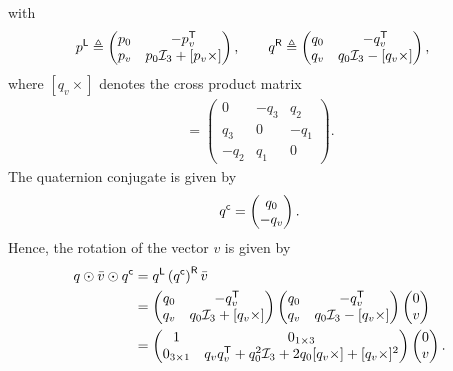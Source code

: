 with 
\begin{align}
p^{\mathsf{L}} &\triangleq \begin{pmatrix} p_0 & -p_v^{\mathsf{T}} \\ p_v & p_0 \mathcal{I}_3 + [p_v \times] \end{pmatrix}, \qquad q^{\mathsf{R}} \triangleq \begin{pmatrix} q_0 & -q_v^{\mathsf{T}} \\ q_v & q_0 \mathcal{I}_3 - [q_v \times] \end{pmatrix},
\end{align}
where $[q_v \times]$ denotes the cross product matrix
\begin{align}
[q_v \times] = \begin{pmatrix} 0 & -q_3 & q_2 \\ q_3 & 0 & -q_1 \\ -q_2 & q_1 & 0 \end{pmatrix}.
\label{eq:app-matrixCross}
\end{align}
The quaternion conjugate is given by 
\begin{align}
q^{\mathsf{c}} = \begin{pmatrix} q_0 \\ - q_v\end{pmatrix}.
\end{align}
Hence, the rotation of the vector $v$ is given by
\begin{align}
q \odot \bar{v} \odot q^{\mathsf{c}} &= q^{\mathsf{L}} \left( q^{\mathsf{c}} \right)^{\mathsf{R}} \bar{v} \nonumber \\
&= \begin{pmatrix} q_0 & -q_v^{\mathsf{T}} \\ q_v & q_0 \mathcal{I}_3 + [q_v \times] \end{pmatrix} \begin{pmatrix} q_0 & -q_v^{\mathsf{T}} \\ q_v & q_0 \mathcal{I}_3 - [q_v \times] \end{pmatrix}  \begin{pmatrix} 0 \\ v \end{pmatrix} \nonumber \\
&=\begin{pmatrix} 1 & 0_{1 \times 3} \\ 0_{3 \times 1} & q_v q_v^{\mathsf{T}}  + q_0^2 \mathcal{I}_3 + 2 q_0 [q_v \times]  + [q_v \times ]^2 \end{pmatrix}  
\begin{pmatrix} 0 \\ v \end{pmatrix}.
\label{eq:app-rotVectorq}
\end{align}

